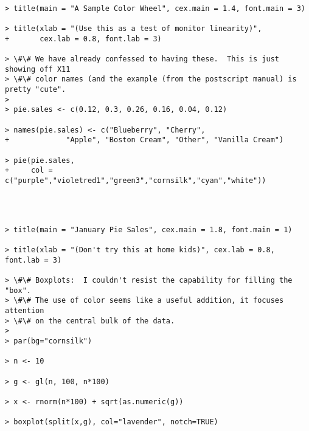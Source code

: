 \documentclass[11pt]{article}
\begin{document}
    \begin{Verbatim}[commandchars=\\\{\}]

> title(main = "A Sample Color Wheel", cex.main = 1.4, font.main = 3)

> title(xlab = "(Use this as a test of monitor linearity)",
+       cex.lab = 0.8, font.lab = 3)

> \#\# We have already confessed to having these.  This is just showing off X11
> \#\# color names (and the example (from the postscript manual) is pretty "cute".
> 
> pie.sales <- c(0.12, 0.3, 0.26, 0.16, 0.04, 0.12)

> names(pie.sales) <- c("Blueberry", "Cherry",
+ 		      "Apple", "Boston Cream", "Other", "Vanilla Cream")

> pie(pie.sales,
+     col = c("purple","violetred1","green3","cornsilk","cyan","white"))

    \end{Verbatim}

    \begin{center}
    \end{center}
    { \hspace*{\fill} \\}
    
    \begin{Verbatim}[commandchars=\\\{\}]

> title(main = "January Pie Sales", cex.main = 1.8, font.main = 1)

> title(xlab = "(Don't try this at home kids)", cex.lab = 0.8, font.lab = 3)

> \#\# Boxplots:  I couldn't resist the capability for filling the "box".
> \#\# The use of color seems like a useful addition, it focuses attention
> \#\# on the central bulk of the data.
> 
> par(bg="cornsilk")

> n <- 10

> g <- gl(n, 100, n*100)

> x <- rnorm(n*100) + sqrt(as.numeric(g))

> boxplot(split(x,g), col="lavender", notch=TRUE)

    \end{Verbatim}

    \begin{center}
    \end{center}
    { \hspace*{\fill} \\}
    
\end{document}
